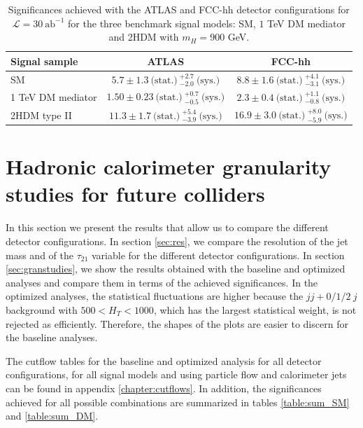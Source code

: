 \begin{table}
	\centering
	\caption{Significances achieved with the ATLAS and FCC-hh detector configurations for $\mathcal{L}=30~\text{ab}^{-1}$ for the three benchmark signal models: SM, $1$ TeV DM mediator and 2HDM with $m_H=900$ GeV.}
	\label{table:FCC_ATLAS_comp}
	\begin{tabular}{lcc}
		\toprule 
		\textbf{Signal sample} & ATLAS  & FCC-hh  \\
		\midrule
		SM & $5.7\pm 1.3 ~\text{(stat.)}~^{+2.7}_{-2.0}~\text{(sys.)}$ & $8.8\pm 1.6~\text{(stat.)}~^{+4.1}_{-3.1}~\text{(sys.)}$ \\
		\rowcolor{black!7}1 TeV DM mediator & $1.50\pm0.23 ~\text{(stat.)}~^{+0.7}_{-0.5}~\text{(sys.)}$ & $2.3\pm0.4 ~\text{(stat.)}~^{+1.1}_{-0.8}~\text{(sys.)}$ \\
		2HDM type II & $11.3\pm 1.7 ~\text{(stat.)}~^{+5.4}_{-3.9}~\text{(sys.)}$ &  $16.9\pm3.0~\text{(stat.)}~^{+8.0}_{-5.9}~\text{(sys.)}$\\ 
		\bottomrule

	\end{tabular}
	
\end{table}


\section{Hadronic calorimeter granularity studies for future colliders}
\label{sec:gran_studies}

In this section we present the results that allow us to compare the different detector configurations. In section \ref{sec:res}, we compare the resolution of the jet mass and of the $\tau_{21}$ variable for the different detector configurations. In section \ref{sec:granstudies}, we show the results obtained with the baseline and optimized analyses and compare them in terms of the achieved significances. In the optimized analyses, the statistical fluctuations are higher because the $jj+0/1/2~j$ background with $500<H_T<1000$, which has the largest statistical weight, is not rejected as efficiently. Therefore, the shapes of the plots are easier to discern for the baseline analyses. 

The cutflow tables for the baseline and optimized analysis for all detector configurations, for all signal models and using particle flow and calorimeter jets can be found in appendix \ref{chapter:cutflows}. In addition, the significances achieved for all possible combinations are summarized in tables \ref{table:sum_SM} and \ref{table:sum_DM}.

